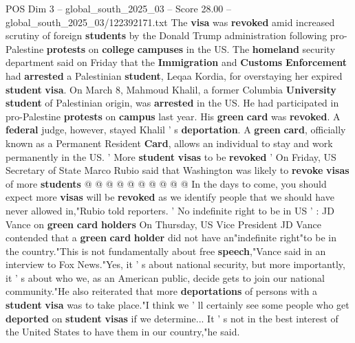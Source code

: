 \begin{textsample}{POS Dim 3 – global\_south\_2025\_03 – Score 28.00 – global\_south\_2025\_03/122392171.txt}
The \textbf{visa} was \textbf{revoked} amid increased scrutiny of foreign \textbf{students} by the Donald Trump administration following pro-Palestine \textbf{protests} on \textbf{college} \textbf{campuses} in the US.
The \textbf{homeland} security department said on Friday that the \textbf{Immigration} and \textbf{Customs} \textbf{Enforcement} had \textbf{arrested} a Palestinian \textbf{student}, Leqaa Kordia, for overstaying her expired \textbf{student} \textbf{visa}.
On March 8, Mahmoud Khalil, a former Columbia \textbf{University} \textbf{student} of Palestinian origin, was \textbf{arrested} in the US.
He had participated in pro-Palestine \textbf{protests} on \textbf{campus} last year.
His \textbf{green} \textbf{card} was \textbf{revoked}.
A \textbf{federal} judge, however, stayed Khalil ' s \textbf{deportation}.
A \textbf{green} \textbf{card}, officially known as a Permanent Resident \textbf{Card}, allows an individual to stay and work permanently in the US. ' More \textbf{student} \textbf{visas} to be \textbf{revoked} ' On Friday, US Secretary of State Marco Rubio said that Washington was likely to \textbf{revoke} \textbf{visas} of more \textbf{students} @ @ @ @ @ @ @ @ @ @ In the days to come, you should expect more \textbf{visas} will be \textbf{revoked} as we identify people that we should have never allowed in,"Rubio told reporters. ' No indefinite right to be in US ' : JD Vance on \textbf{green} \textbf{card} \textbf{holders} On Thursday, US Vice President JD Vance contended that a \textbf{green} \textbf{card} \textbf{holder} did not have an"indefinite right"to be in the country."This is not fundamentally about free \textbf{speech},"Vance said in an interview to Fox News."Yes, it ' s about national security, but more importantly, it ' s about who we, as an American public, decide gets to join our national community."He also reiterated that more \textbf{deportations} of persons with a \textbf{student} \textbf{visa} was to take place."I think we ' ll certainly see some people who get \textbf{deported} on \textbf{student} \textbf{visas} if we determine...
It ' s not in the best interest of the United States to have them in our country,"he said.

\end{textsample}
